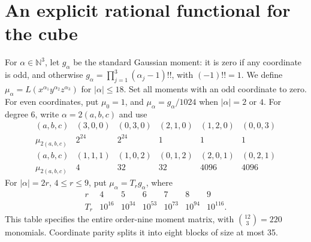 \documentclass[11pt]{article}
\begin{document}
\section{An explicit rational functional for the cube}
For $\alpha\in\mathbb N^3$, let $g_\alpha$ be the standard Gaussian moment:
it is zero if any coordinate is odd, and otherwise
$g_\alpha=\prod_{j=1}^3(\alpha_j-1)!!$, with $(-1)!!=1$.
We define $\mu_\alpha=L(x^{\alpha_1}y^{\alpha_2}z^{\alpha_3})$
for $|\alpha|\le18$. Set all moments with an odd coordinate to zero.
For even coordinates, put $\mu_0=1$, and
$\mu_\alpha=g_\alpha/1024$ when $|\alpha|=2$ or $4$.
For degree 6, write $\alpha=2(a,b,c)$ and use
\[
\begin{array}{c|rrrrr}
(a,b,c)&(3,0,0)&(0,3,0)&(2,1,0)&(1,2,0)&(0,0,3)\\\hline
\mu_{2(a,b,c)}&2^{24}&2^{24}&1&1&1\\[2pt]
(a,b,c)&(1,1,1)&(1,0,2)&(0,1,2)&(2,0,1)&(0,2,1)\\\hline
\mu_{2(a,b,c)}&4&32&32&4096&4096
\end{array}
\]
For $|\alpha|=2r$, $4\le r\le9$, put $\mu_\alpha=T_rg_\alpha$, where
\begin{equation}\label{eq:scales}
\begin{array}{c|rrrrrr}
r&4&5&6&7&8&9\\\hline
T_r&10^{16}&10^{34}&10^{53}&10^{73}&10^{94}&10^{116}.
\end{array}
\end{equation}
This table specifies the entire order-nine moment matrix, with
$\binom{12}{3}=220$ monomials. Coordinate parity splits it into eight
blocks of size at most 35.
\end{document}

